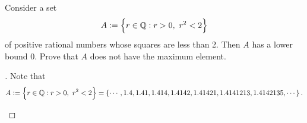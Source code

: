 \documentclass[11pt,openany]{article}
\begin{document}
\newpage
\begin{exercise*}[\textcolor{violet}{$\star$}]
	Consider a set \[
	A:=\set{r\in\Q:r>0,\ r^2<2}
	\] of positive rational numbers whose squares are less than 2. Then $A$ has a lower bound $0$. Prove that $A$ does not have the maximum element.
	\begin{proof}[\sol]
		Note that \[
		A:=\set{r\in\Q:r>0,\ r^2<2}=\set{\cdots,1.4, 1.41, 1.414, 1.4142, 1.41421, 1.4141213, 1.4142135, \cdots}.
		\] 
		\begin{center}
		
		\end{center}
\vfill
	\end{proof}
\end{exercise*}
\end{document}
